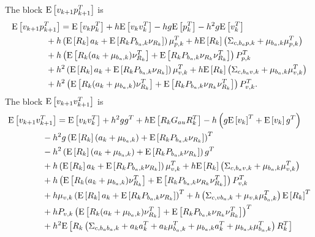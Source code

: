 \begin{theorem}
	The block $\mathrm{E}\left[ v_{k+1}p_{k+1}^T \right]$ is
	\begin{align} \label{eqn:posEst-prop-Evp}
		&\mathrm{E}\left[ v_{k+1}p_{k+1}^T \right] = \mathrm{E}\left[ v_kp_k^T \right] + h\mathrm{E}\left[ v_kv_k^T \right] - hg\mathrm{E}\left[ p_k^T \right] - h^2g\mathrm{E}\left[ v_k^T \right] \nonumber \\
		&\qquad\qquad + h\left( \mathrm{E}\left[ R_k \right]a_k + \mathrm{E}\left[ R_kP_{b_a,k}\nu_{R_k} \right] \right) \mu_{p,k}^T + h\mathrm{E}\left[ R_k \right] \left( \Sigma_{c,b_ap,k} + \mu_{b_a,k}\mu_{p,k}^T \right) \nonumber \\
		&\qquad\qquad + h\left( \mathrm{E}\left[ R_k(a_k+\mu_{b_a,k})\nu_{R_k}^T \right] + \mathrm{E}\left[ R_kP_{b_a,k}\nu_{R_k}\nu_{R_k}^T \right] \right) P_{p,k}^T \nonumber \\
		&\qquad\qquad + h^2\left( \mathrm{E}\left[ R_k \right]a_k + \mathrm{E}\left[ R_kP_{b_a,k}\nu_{R_k} \right] \right) \mu_{v,k}^T + h\mathrm{E}\left[ R_k \right] \left( \Sigma_{c,b_av,k} + \mu_{b_a,k}\mu_{v,k}^T \right) \nonumber \\
		&\qquad\qquad + h^2\left( \mathrm{E}\left[ R_k(a_k+\mu_{b_a,k})\nu_{R_k}^T \right] + \mathrm{E}\left[ R_kP_{b_a,k}\nu_{R_k}\nu_{R_k}^T \right] \right) P_{v,k}^T.
	\end{align}
	The block $\mathrm{E}\left[ v_{k+1}v_{k+1}^T \right]$ is
	\begin{align} \label{eqn:posEst-prop-Evv}
		&\expect{v_{k+1}v_{k+1}^T} = \expect{v_kv_k^T} + h^2gg^T + h \expect{R_kG_{au}R_k^T} - h\left( g\expect{v_k}^T + \expect{v_k}g^T \right) \nonumber \\
		&\qquad\qquad - h^2g\left( \expect{R_k}(a_k+\mu_{b_a,k}) + \expect{R_kP_{b_a,k}\nu_{R_k}} \right)^T \nonumber \\
		&\qquad\qquad - h^2\left( \expect{R_k}(a_k+\mu_{b_a,k}) + \expect{R_kP_{b_a,k}\nu_{R_k}} \right)g^T \nonumber \\
		&\qquad\qquad + h\left( \expect{R_k}a_k + \expect{R_kP_{b_a,k}\nu_{R_k}} \right) \mu_{v,k}^T + h\expect{R_k} \left( \Sigma_{c,b_av,k} + \mu_{b_a,k}\mu_{v,k}^T \right) \nonumber \\
		&\qquad\qquad + h\left( \expect{R_k(a_k+\mu_{b_a,k})\nu_{R_k}^T} + \expect{R_kP_{b_a,k}\nu_{R_k}\nu_{R_k}^T} \right) P_{v,k}^T \nonumber \\
		&\qquad\qquad + h\mu_{v,k}\left( \expect{R_k}a_k + \expect{R_kP_{b_a,k}\nu_{R_k}} \right)^T + h\left( \Sigma_{c,vb_a,k} + \mu_{v,k}\mu_{b_a,k}^T \right) \expect{R_k}^T \nonumber \\
		&\qquad\qquad + hP_{v,k}\left( \expect{R_k(a_k+\mu_{b_a,k})\nu_{R_k}^T} + \expect{R_kP_{b_a,k}\nu_{R_k}\nu_{R_k}^T} \right)^T \nonumber \\
		&\qquad\qquad + h^2\expect{ R_k\left( \Sigma_{c,b_ab_a,k} + a_ka_k^T + a_k\mu_{b_a,k}^T + \mu_{b_a,k}a_k^T + \mu_{b_a,k}\mu_{b_a,k}^T \right)R_k^T } \nonumber \\

\end{align}
\end{theorem}
